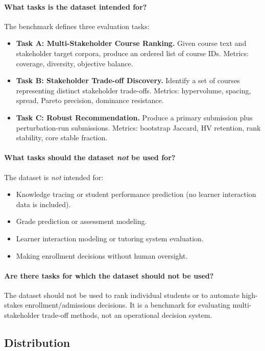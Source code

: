 \paragraph{What tasks is the dataset intended for?}
The benchmark defines three evaluation tasks:
\begin{itemize}
  \item \textbf{Task A: Multi-Stakeholder Course Ranking.} Given course text and stakeholder target corpora, produce an ordered list of course IDs. Metrics: coverage, diversity, objective balance.
  \item \textbf{Task B: Stakeholder Trade-off Discovery.} Identify a set of courses representing distinct stakeholder trade-offs. Metrics: hypervolume, spacing, spread, Pareto precision, dominance resistance.
  \item \textbf{Task C: Robust Recommendation.} Produce a primary submission plus perturbation-run submissions. Metrics: bootstrap Jaccard, HV retention, rank stability, core stable fraction.
\end{itemize}

\paragraph{What tasks should the dataset \emph{not} be used for?}
The dataset is \emph{not} intended for:
\begin{itemize}
  \item Knowledge tracing or student performance prediction (no learner interaction data is included).
  \item Grade prediction or assessment modeling.
  \item Learner interaction modeling or tutoring system evaluation.
  \item Making enrollment decisions without human oversight.
\end{itemize}

\paragraph{Are there tasks for which the dataset should not be used?}
The dataset should not be used to rank individual students or to automate high-stakes enrollment/admissions decisions. It is a benchmark for evaluating multi-stakeholder trade-off methods, not an operational decision system.

\subsection{Distribution}

